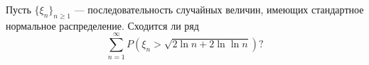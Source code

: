 \documentclass{article}
\begin{document}
Пусть $\{ \xi_n \}_{n \geqslant 1}$ --- последовательность случайных величин, имеющих стандартное нормальное распределение. Сходится ли ряд
$$\sum_{n=1}^\infty P \left(\xi_n > \sqrt{2 \ln n + 2\ln \ln n} \right)?$$
\end{document}
